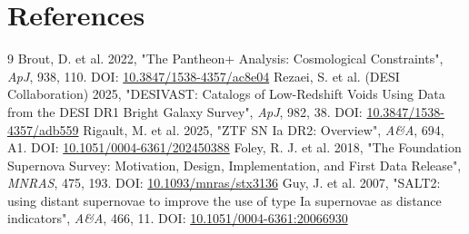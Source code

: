 \documentclass[11pt,a4paper]{article}
\begin{document}
\section{References}
\begin{thebibliography}{9}
 Brout, D. et al. 2022, "The Pantheon+ Analysis: Cosmological Constraints", \emph{ApJ}, 938, 110. DOI: \href{https://doi.org/10.3847/1538-4357/ac8e04}{10.3847/\allowbreak{}1538-4357/\allowbreak{}ac8e04}
 Rezaei, S. et al. (DESI Collaboration) 2025, "DESIVAST: Catalogs of Low-Redshift Voids Using Data from the DESI DR1 Bright Galaxy Survey", \emph{ApJ}, 982, 38. DOI: \href{https://doi.org/10.3847/1538-4357/adb559}{10.3847/\allowbreak{}1538-4357/\allowbreak{}adb559}
 Rigault, M. et al. 2025, "ZTF SN Ia DR2: Overview", \emph{A\&A}, 694, A1. DOI: \href{https://doi.org/10.1051/0004-6361/202450388}{10.1051/\allowbreak{}0004-6361/\allowbreak{}202450388}
 Foley, R. J. et al. 2018, "The Foundation Supernova Survey: Motivation, Design, Implementation, and First Data Release", \emph{MNRAS}, 475, 193. DOI: \href{https://doi.org/10.1093/mnras/stx3136}{10.1093/\allowbreak{}mnras/\allowbreak{}stx3136}
 Guy, J. et al. 2007, "SALT2: using distant supernovae to improve the use of type Ia supernovae as distance indicators", \emph{A\&A}, 466, 11. DOI: \href{https://doi.org/10.1051/0004-6361:20066930}{10.1051/\allowbreak{}0004-6361:20066930}
\end{thebibliography}
\end{document}
